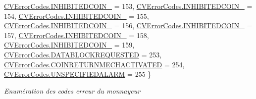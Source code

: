 \begin{DoxyCompactItemize}
\mbox{\hyperlink{group___erreur_gga68c5b73cc3b337502d9f92154d933591a2ee2098b225ed3267340fcb4cf8bef7f}{C\+V\+Error\+Codes.\+I\+N\+H\+I\+B\+I\+T\+E\+D\+C\+O\+I\+N\+\_}} = 153, 
\mbox{\hyperlink{group___erreur_gga68c5b73cc3b337502d9f92154d933591afd42c8c1e81adbaae30e5d950d87fc91}{C\+V\+Error\+Codes.\+I\+N\+H\+I\+B\+I\+T\+E\+D\+C\+O\+I\+N\+\_}} = 154, 
\newline
\mbox{\hyperlink{group___erreur_gga68c5b73cc3b337502d9f92154d933591a92bbc06e80c7891c058dd4f82f21cc84}{C\+V\+Error\+Codes.\+I\+N\+H\+I\+B\+I\+T\+E\+D\+C\+O\+I\+N\+\_}} = 155, 
\mbox{\hyperlink{group___erreur_gga68c5b73cc3b337502d9f92154d933591a847a981b702782737c4d8d68ae43df96}{C\+V\+Error\+Codes.\+I\+N\+H\+I\+B\+I\+T\+E\+D\+C\+O\+I\+N\+\_}} = 156, 
\mbox{\hyperlink{group___erreur_gga68c5b73cc3b337502d9f92154d933591a9eacc103c55f026c6d4c55d9145dc46c}{C\+V\+Error\+Codes.\+I\+N\+H\+I\+B\+I\+T\+E\+D\+C\+O\+I\+N\+\_}} = 157, 
\mbox{\hyperlink{group___erreur_gga68c5b73cc3b337502d9f92154d933591a7650c785d588d5d802dc392398b5731a}{C\+V\+Error\+Codes.\+I\+N\+H\+I\+B\+I\+T\+E\+D\+C\+O\+I\+N\+\_}} = 158, 
\newline
\mbox{\hyperlink{group___erreur_gga68c5b73cc3b337502d9f92154d933591a0e534ed5f2068211f3b791d94aada1e2}{C\+V\+Error\+Codes.\+I\+N\+H\+I\+B\+I\+T\+E\+D\+C\+O\+I\+N\+\_}} = 159, 
\mbox{\hyperlink{group___erreur_gga68c5b73cc3b337502d9f92154d933591a05062f9114d515e6e34b9b781a68e042}{C\+V\+Error\+Codes.\+D\+A\+T\+A\+B\+L\+O\+C\+K\+R\+E\+Q\+U\+E\+S\+T\+ED}} = 253, 
\mbox{\hyperlink{group___erreur_gga68c5b73cc3b337502d9f92154d933591aa0d2119ea2041bc3e038f9f5f6f5f7b1}{C\+V\+Error\+Codes.\+C\+O\+I\+N\+R\+E\+T\+U\+R\+N\+M\+E\+C\+H\+A\+C\+T\+I\+V\+A\+T\+ED}} = 254, 
\mbox{\hyperlink{group___erreur_gga68c5b73cc3b337502d9f92154d933591a9993b5434242a3193a7a92cfe80b28ab}{C\+V\+Error\+Codes.\+U\+N\+S\+P\+E\+C\+I\+F\+I\+E\+D\+A\+L\+A\+RM}} = 255
 \}
\begin{DoxyCompactList}\small\item\em Enumération des codes erreur du monnayeur \end{DoxyCompactList}\end{DoxyCompactItemize}
